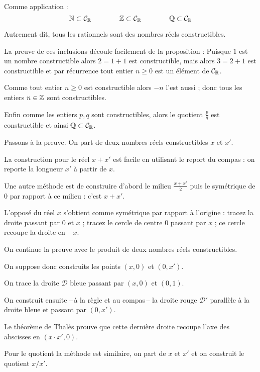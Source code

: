 \change
Comme application :
$$\mathbb{N} \subset \mathcal{C}_{\mathbb{R}} \qquad\qquad \mathbb{Z} \subset \mathcal{C}_{\mathbb{R}} \qquad\qquad \mathbb{Q} \subset \mathcal{C}_{\mathbb{R}}$$


Autrement dit,  tous les rationnels sont des nombres réels constructibles.


La preuve de ces inclusions découle facilement de la proposition :
Puisque $1$ est un nombre constructible alors $2=1+1$ est constructible, mais alors 
$3=2+1$ est constructible et par récurrence tout entier $n\ge 0$ est un élément de $\mathcal{C}_{\mathbb{R}}$.
 
Comme tout entier $n\ge 0$ est constructible alors $-n$ l'est aussi ; donc tous les entiers
 $n\in \mathbb{Z}$ sont constructibles.
 
Enfin comme les entiers $p,q$ sont constructibles, alors le quotient 
$\frac pq$ est constructible et ainsi $\mathbb{Q} \subset \mathcal{C}_{\mathbb{R}}$.

\diapo

Passons à la preuve.
On part de deux nombres réels constructibles $x$ et $x'$.

La construction pour le réel $x+x'$ est facile en utilisant le report 
  du compas : on reporte la longueur $x'$ à partir de $x$. 
  
\change
Une autre méthode est de construire d'abord le milieu $\frac{x+x'}{2}$ puis le symétrique de 
  $0$ par rapport à ce milieu : c'est $x+x'$.
  
\change
L'opposé du réel $x$ s'obtient comme symétrique par rapport à l'origine : 
  tracez la droite passant par $0$ et $x$ ; tracez le cercle de centre 
  $0$ passant par $x$  ; ce cercle recoupe la droite en $-x$. 
  
  
\diapo 

On continue la preuve avec le produit de deux nombres réels constructibles.

\change
On suppose donc construits les points $(x,0)$ et $(0,x')$.

\change
On trace la droite $\mathcal{D}$ bleue passant par $(x,0)$ et $(0,1)$. 

\change
On construit ensuite --\,à la règle et au compas\,-- la droite rouge $\mathcal{D}'$
  parallèle à la droite bleue et passant par $(0,x')$. 

\change
  Le théorème de Thalès prouve que 
  cette dernière droite recoupe l'axe des abscisses en $(x\cdot x',0)$. 
  
\change
Pour le quotient la méthode est similaire, on part de $x$ et $x'$ et on construit
le quotient $x/x'$.


